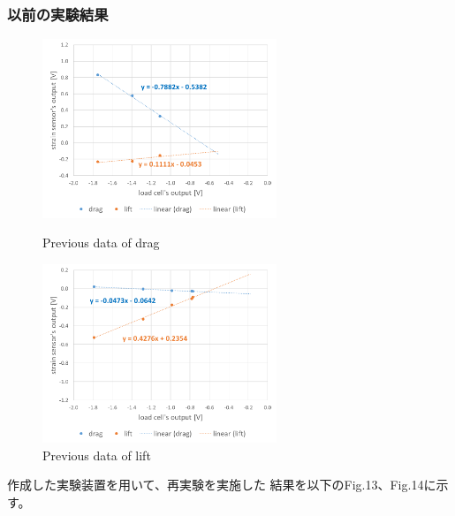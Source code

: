 \documentclass[twocolumn,a4j]{jsarticle}
\begin{document}
\subsubsection*{以前の実験結果}
\begin{figure}[htbp]
    \footnotesize
    \begin{center}
        \includegraphics[width=70mm]{../images/graph_21119_drag_previous.png}
        \caption{Previous data of drag}
        \includegraphics[width=70mm]{../images/graph_21119_lift_previous.png}
        \caption{Previous data of lift}
    \end{center}
\end{figure}

\newpage
作成した実験装置を用いて、再実験を実施した
結果を以下のFig.13、Fig.14に示す。\\
\end{document}
